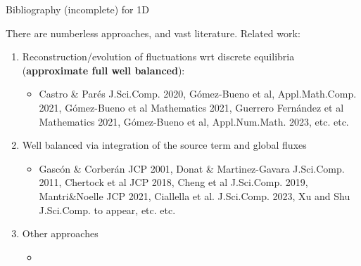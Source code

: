 \begin{frame}{Bibliography (incomplete) for 1D}
\MyLogoa

There are numberless approaches, and vast literature.
Related work:

\begin{enumerate}

\vspace{0.5cm}

\item Reconstruction/evolution of fluctuations wrt  discrete equilibria ({\bf approximate  full well balanced}):

\begin{itemize}
\item {\scriptsize    Castro \& Par\'es J.Sci.Comp. 2020,   G\'omez-Bueno et al, Appl.Math.Comp. 2021,   G\'omez-Bueno et al  Mathematics 2021,
Guerrero Fern\'andez et al  Mathematics 2021,   G\'omez-Bueno et al, Appl.Num.Math.  2023, etc. etc.}
\end{itemize}

\vspace{0.5cm}


\item Well balanced via integration of the source term and  global fluxes 

\begin{itemize}
\item {\scriptsize   Gasc\'on  \& Corber\'an  JCP 2001,  Donat \& Martinez-Gavara   J.Sci.Comp. 2011, 
Chertock et al JCP 2018, Cheng et al J.Sci.Comp. 2019, Mantri\&Noelle   JCP  2021,  
Ciallella et al.   J.Sci.Comp. 2023,   Xu and Shu J.Sci.Comp. to appear, etc. etc.} 
\end{itemize}

\vspace{0.5cm}


\item  Other approaches 

\begin{itemize}
\item 
\end{itemize}


\end{enumerate}


\end{frame}
 
 



